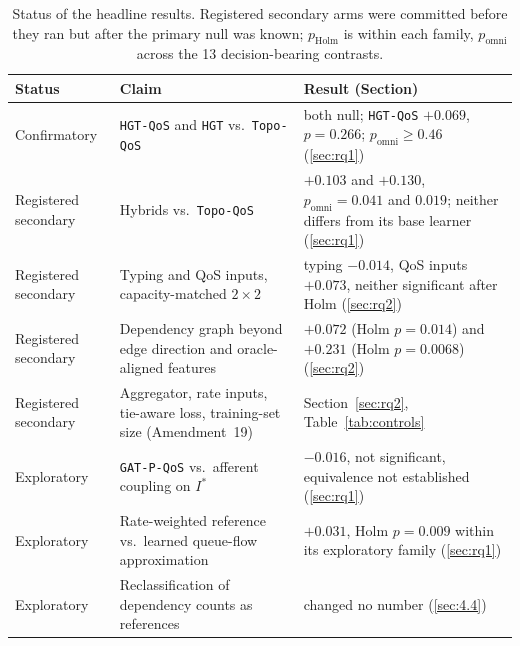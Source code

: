 \begin{table}[htbp]
\centering
\footnotesize
\caption{Status of the headline results. Registered secondary arms were committed before they ran but after the primary null was known; $p_{\text{Holm}}$ is within each family, $p_{\text{omni}}$ across the 13 decision-bearing contrasts.}
\label{tab:claims}
\setlength{\tabcolsep}{3pt}
\begin{tabular}{@{}p{2.3cm}p{5.4cm}p{6.2cm}@{}}
\toprule
\textbf{Status} & \textbf{Claim} & \textbf{Result (Section)} \\
\midrule
Confirmatory & \texttt{HGT-QoS} and \texttt{HGT} vs.\ \texttt{Topo-QoS} & both null; \texttt{HGT-QoS} $+0.069$, $p = 0.266$; $p_{\text{omni}} \ge 0.46$ (\ref{sec:rq1}) \\
Registered secondary & Hybrids vs.\ \texttt{Topo-QoS} & $+0.103$ and $+0.130$, $p_{\text{omni}} = 0.041$ and $0.019$; neither differs from its base learner (\ref{sec:rq1}) \\
Registered secondary & Typing and QoS inputs, capacity-matched $2\times2$ & typing $-0.014$, QoS inputs $+0.073$, neither significant after Holm (\ref{sec:rq2}) \\
Registered secondary & Dependency graph beyond edge direction and oracle-aligned features & $+0.072$ (Holm $p = 0.014$) and $+0.231$ (Holm $p = 0.0068$) (\ref{sec:rq2}) \\
Registered secondary & Aggregator, rate inputs, tie-aware loss, training-set size (Amendment~19) & Section~\ref{sec:rq2}, Table~\ref{tab:controls} \\
Exploratory & \texttt{GAT-P-QoS} vs.\ afferent coupling on $I^*$ & $-0.016$, not significant, equivalence not established (\ref{sec:rq1}) \\
Exploratory & Rate-weighted reference vs.\ learned queue-flow approximation & $+0.031$, Holm $p = 0.009$ within its exploratory family (\ref{sec:rq1}) \\
Exploratory & Reclassification of dependency counts as references & changed no number (\ref{sec:4.4}) \\
\bottomrule
\end{tabular}
\end{table}
